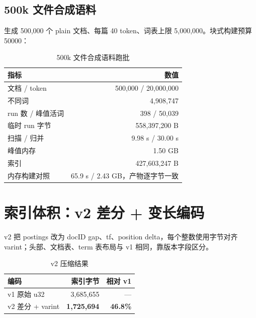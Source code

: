 \subsection{500k 文件合成语料}

 生成 500,000 个 plain 文档、每篇 40 token、词表上限 5,000,000。块式构建预算 50000：

\begin{table}[H]
  \centering
  \caption{500k 文件合成语料跑批}
  \label{tab:spimi-500k}
  \small
  \begin{tabularx}{0.85\linewidth}{@{}X r@{}}
    \toprule
    指标 & 数值 \\
    \midrule
    文档 / token & 500,000 / 20,000,000 \\
    不同词 & 4,908,747 \\
    run 数 / 峰值活词 & 398 / 50,039 \\
    临时 run 字节 & 558,397,200 B \\
    扫描 / 归并 & 9.98 s / 30.00 s \\
    峰值内存 & 1.50 GB \\
    索引 & 427,603,247 B \\
    内存构建对照 & 65.9 s / 2.43 GB，产物逐字节一致 \\
    \bottomrule
  \end{tabularx}
\end{table}


\section{索引体积：v2 差分 + 变长编码}

v2 把 postings 改为 docID gap、tf、position delta，每个整数使用字节对齐 varint；头部、文档表、term 表布局与 v1 相同，靠版本字段区分。

\begin{table}[H]
  \centering
  \caption{v2 压缩结果}
  \label{tab:v2}
  \small
  \begin{tabularx}{0.75\linewidth}{@{}l r r@{}}
    \toprule
    编码 & 索引字节 & 相对 v1 \\
    \midrule
    v1 原始 u32 & 3,685,655 & — \\
    v2 差分 + varint & \textbf{1,725,694} & \textbf{46.8\%} \\
    \bottomrule
  \end{tabularx}
\end{table}

